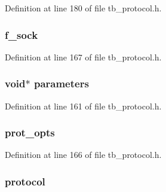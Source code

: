 Definition at line 180 of file tb\-\_\-protocol.\-h.

\hypertarget{structtb__protocol__t_a48ae54bbd3f3cdfe397aba482cfcf7b5}{
\subsubsection[{f\-\_\-sock}]{ f\-\_\-sock}}\label{structtb__protocol__t_a48ae54bbd3f3cdfe397aba482cfcf7b5}


Definition at line 167 of file tb\-\_\-protocol.\-h.

\hypertarget{structtb__protocol__t_ae6c752a4c1c05c1fbd5623711f467712}{
\subsubsection[{parameters}]{\setlength{\rightskip}{0pt plus 5cm}void$\ast$ parameters}}\label{structtb__protocol__t_ae6c752a4c1c05c1fbd5623711f467712}


Definition at line 161 of file tb\-\_\-protocol.\-h.

\hypertarget{structtb__protocol__t_aa6fcad19412b8f80ba0dd887b3030010}{
\subsubsection[{prot\-\_\-opts}]{ prot\-\_\-opts}}\label{structtb__protocol__t_aa6fcad19412b8f80ba0dd887b3030010}


Definition at line 166 of file tb\-\_\-protocol.\-h.

\hypertarget{structtb__protocol__t_a0d2276cd987e688180eedab183cd503e}{
\subsubsection[{protocol}]{ protocol}}\label{structtb__protocol__t_a0d2276cd987e688180eedab183cd503e}


